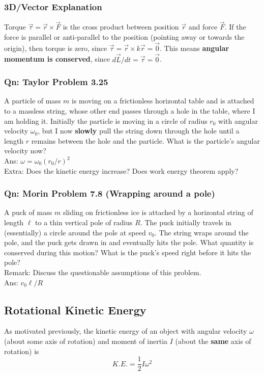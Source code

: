 \documentclass{article}
\begin{document}
\subsubsection{3D/Vector Explanation}
Torque $\vec{\tau} = \vec{r} \times \vec{F}$ is the cross product between position $\vec{r}$ and force $\vec{F}$. If the force is parallel or anti-parallel to the position (pointing away or towards the origin), then torque is zero, since $\vec{\tau} = \vec{r} \times k\vec{r} = \vec{0}$. This means \textbf{angular momentum is conserved}, since ${d\vec{L}}/dt = \vec{\tau} = \vec{0}$.
\subsubsection{Qn: Taylor Problem 3.25}
A particle of mass $m$ is moving on a frictionless horizontal table and is attached to a massless string, whose other end passes through a hole in the table, where I am holding it. Initially the particle is moving in a circle of radius $r_0$ with angular velocity $\omega_0$, but I now \textbf{slowly} pull the string down through the hole until a length $r$ remains between the hole and the particle. What is the particle's angular velocity now?\\[10pt]
Ans: $\omega = \omega_0 (r_0/r)^2 $ \\[10pt]
Extra: Does the kinetic energy increase? Does work energy theorem apply? 

\subsubsection{Qn: Morin Problem 7.8 (Wrapping around a pole)}
A puck of mass $m$ sliding on frictionless ice is attached by a horizontal string of length $\ell$ to a thin vertical pole of radius $R$. The puck initially travels in (essentially) a circle around the pole at speed $v_0$. The string wraps around the pole, and the puck gets drawn in and eventually hits the pole. What quantity is conserved during this motion? What is the puck's speed right before it hits the pole?\\[5pt]
Remark: Discuss the questionable assumptions of this problem.\\[5pt]
Ans: $v_0 \ell / R$


\subsection{Rotational Kinetic Energy}
As motivated previously, the kinetic energy of an object with angular velocity $\omega$ (about some axis of rotation) and moment of inertia $I$ (about the \textbf{same} axis of rotation) is $$K.E. = \frac{1}{2} I \omega^2$$
\end{document}
